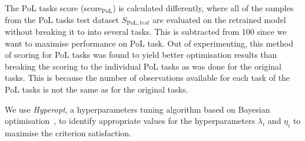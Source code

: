 The PoL tasks score (score$_{\text{PoL}}$) is calculated differently, where all of the samples from the PoL tasks test dataset $S_{\text{PoL}, test}$ are evaluated on the retrained model without breaking it to into several tasks. This is subtracted from 100 since we want to maximise performance on PoL task.
%
Out of experimenting, this method of scoring for PoL tasks was found to yield better optimisation results than breaking the scoring to the individual PoL tasks as was done for the original tasks. 
%
This is because the number of observations available for each task of the PoL tasks is not the same as for the original tasks. 

We use \textit{Hyperopt}, a hyperparameters tuning algorithm based on Bayesian optimisation~\cite{Mockus1975,Snoek2012,Feurer2019}, to identify appropriate values for the hyperparameters $\lambda_i$ and $\eta_i$ to maximise the criterion satisfaction.


